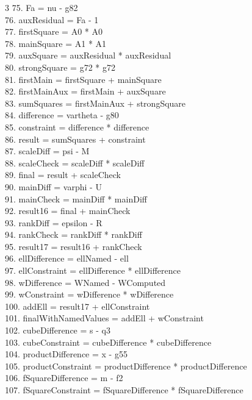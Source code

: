 \documentclass[10pt]{article}
\begin{document}
\begin{multicols}{3}
75. Fa = nu - g82\\
76. auxResidual = Fa - 1\\
77. firstSquare = A0 * A0\\
78. mainSquare = A1 * A1\\
79. auxSquare = auxResidual * auxResidual\\
80. strongSquare = g72 * g72\\
81. firstMain = firstSquare + mainSquare\\
82. firstMainAux = firstMain + auxSquare\\
83. sumSquares = firstMainAux + strongSquare\\
84. difference = vartheta - g80\\
85. constraint = difference * difference\\
86. result = sumSquares + constraint\\
87. scaleDiff = psi - M\\
88. scaleCheck = scaleDiff * scaleDiff\\
89. final = result + scaleCheck\\
90. mainDiff = varphi - U\\
91. mainCheck = mainDiff * mainDiff\\
92. result16 = final + mainCheck\\
93. rankDiff = epsilon - R\\
94. rankCheck = rankDiff * rankDiff\\
95. result17 = result16 + rankCheck\\
96. ellDifference = ellNamed - ell\\
97. ellConstraint = ellDifference * ellDifference\\
98. wDifference = WNamed - WComputed\\
99. wConstraint = wDifference * wDifference\\
100. addEll = result17 + ellConstraint\\
101. finalWithNamedValues = addEll + wConstraint\\
102. cubeDifference = s - q3\\
103. cubeConstraint = cubeDifference * cubeDifference\\
104. productDifference = x - g55\\
105. productConstraint = productDifference * productDifference\\
106. fSquareDifference = m - f2\\
107. fSquareConstraint = fSquareDifference * fSquareDifference\\

\end{multicols}
\end{document}
